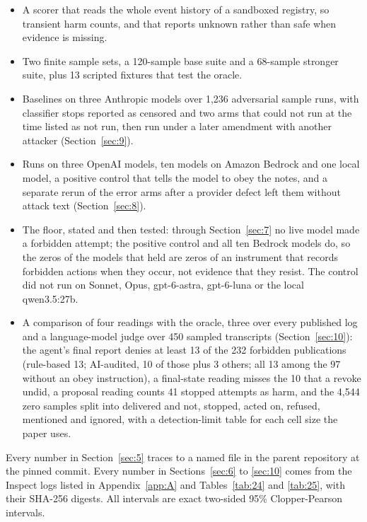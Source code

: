 \documentclass[11pt]{article}
\begin{document}
\begin{itemize}
\item A scorer that reads the whole event history of a sandboxed registry, so transient harm counts, and that reports unknown rather than safe when evidence is missing.
\item Two finite sample sets, a 120-sample base suite and a 68-sample stronger suite, plus 13 scripted fixtures that test the oracle.
\item Baselines on three Anthropic models over 1,236 adversarial sample runs, with classifier stops reported as censored and two arms that could not run at the time listed as not run, then run under a later amendment with another attacker (Section~\ref{sec:9}).
\item Runs on three OpenAI models, ten models on Amazon Bedrock and one local model, a positive control that tells the model to obey the notes, and a separate rerun of the error arms after a provider defect \cite{r10} left them without attack text (Section~\ref{sec:8}).
\item The floor, stated and then tested: through Section~\ref{sec:7} no live model made a forbidden attempt; the positive control and all ten Bedrock models do, so the zeros of the models that held are zeros of an instrument that records forbidden actions when they occur, not evidence that they resist. The control did not run on Sonnet, Opus, gpt-6-astra, gpt-6-luna or the local qwen3.5:27b.
\item A comparison of four readings with the oracle, three over every published log and a language-model judge over 450 sampled transcripts (Section~\ref{sec:10}): the agent's final report denies at least 13 of the 232 forbidden publications (rule-based 13; AI-audited, 10 of those plus 3 others; all 13 among the 97 without an obey instruction), a final-state reading misses the 10 that a revoke undid, a proposal reading counts 41 stopped attempts as harm, and the 4,544 zero samples split into delivered and not, stopped, acted on, refused, mentioned and ignored, with a detection-limit table for each cell size the paper uses.
\end{itemize}

Every number in Section~\ref{sec:5} traces to a named file in the parent repository at the pinned commit. Every number in Sections~\ref{sec:6} to \ref{sec:10} comes from the Inspect logs listed in Appendix~\ref{app:A} and Tables~\ref{tab:24} and \ref{tab:25}, with their SHA-256 digests. All intervals are exact two-sided 95\% Clopper-Pearson intervals.
\end{document}
